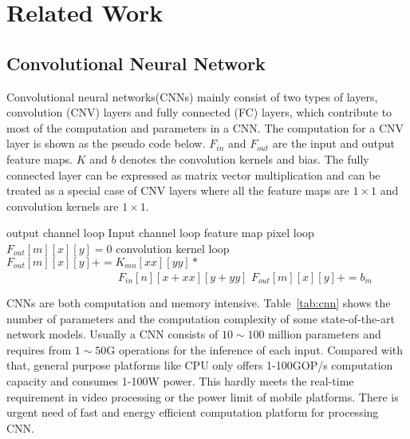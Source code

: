 \section{Related Work}\label{sec:related}


\subsection{Convolutional Neural Network}
Convolutional neural networks(CNNs) mainly consist of two types of layers, convolution (CNV) layers and fully connected (FC) layers, which contribute to most of the computation and parameters in a CNN. The computation for a CNV layer is shown as the pseudo code below. $F_{in}$ and $F_{out}$ are the input and output feature maps. $K$ and $b$ denotes the convolution kernels and bias. The fully connected layer can be expressed as matrix vector multiplication and can be treated as a special case of CNV layers where all the feature maps are $1\times 1$ and convolution kernels are $1\times 1$.

\begin{codebox}
\li \Comment output channel loop
\li {} 
  \Do
\li   \Comment Input channel loop
\li   {}
    \Do
\li  	\Comment feature map pixel loop
\li 	{}
    \Do
\li   	  $F_{out}[m][x][y]=0$
\li 	  \Comment convolution kernel loop
\li 	  {}
          \Do
\li 		$F_{out}[m][x][y] += K_{mn}[xx][yy]*$\\
      $\qquad\qquad\qquad\qquad\qquad F_{in}[n][x+xx][y+yy] $
          \End
\li 	  $F_{out}[m][x][y]+=b_m$
        \End 
    \End
    \End 
\end{codebox}

CNNs are both computation and memory intensive. Table~\ref{tab:cnn} shows the number of parameters and the computation complexity of some state-of-the-art network models. Usually a CNN consists of $10\sim 100$ million parameters and requires from $1\sim 50$G operations for the inference of each input. Compared with that, general purpose platforms like CPU only offers 1-100GOP/s computation capacity and consumes 1-100W power. This hardly meets the real-time requirement in video processing or the power limit of mobile platforms. There is urgent need of fast and energy efficient computation platform for processing CNN.



